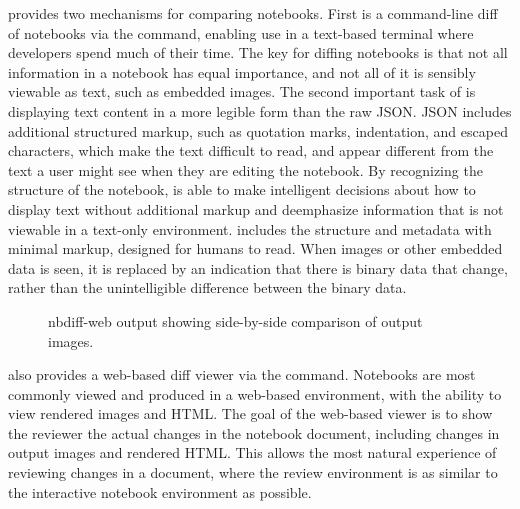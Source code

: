 \documentclass{deliverablereport}
\newcommand{\nbdime}{\software{nbdime}}
\newcommand{\nbdiff}{\software{nbdiff}}
\begin{document}
\nbdime provides two mechanisms for comparing notebooks. First is a command-line diff of notebooks
via the \nbdiff command, enabling use in a text-based terminal where developers spend much
of their time. The key for diffing notebooks is that not all information in a notebook has equal
importance, and not all of it is sensibly viewable as text, such as embedded images. The second
important task of \nbdime is displaying text content in a more legible form than the raw JSON. JSON
includes additional structured markup, such as quotation marks, indentation, and escaped
characters, which make the text difficult to read, and appear different from the text a user might
see when they are editing the notebook. By recognizing the structure of the notebook, \nbdime is
able to make intelligent decisions about how to display text without additional markup and deemphasize information that is not viewable in a text-only environment.
\nbdime includes the structure and metadata with minimal markup, designed for humans to read.
When images or other embedded data is seen, it is replaced by an indication that there is binary data that change, rather than the unintelligible difference between the binary data.

\begin{figure}
    \center
    \caption{nbdiff-web output showing side-by-side comparison of output images.}
    \label{fig:nbdiff-web}
\end{figure}

\nbdime also provides a web-based diff viewer via the  command. Notebooks are
most commonly viewed and produced in a web-based environment, with the ability to view rendered
images and HTML. The goal of the web-based viewer is to show the reviewer the actual changes in the
notebook document, including changes in output images and rendered HTML.
This allows the most natural experience of reviewing changes in a document, where the review environment is as similar to the interactive notebook environment as possible.
\end{document}
